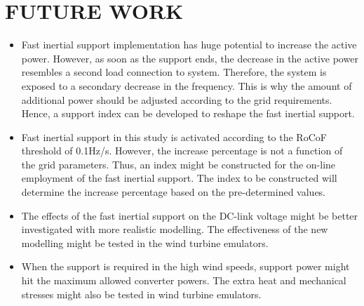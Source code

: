 \section{FUTURE WORK}
\begin{itemize}
	\item Fast inertial support implementation has huge potential to increase the active power. However, as soon as the support ends, the decrease in the active power resembles a second load connection to system. Therefore, the system is exposed to a secondary decrease in the frequency. This is why the amount of additional power should be adjusted according to the grid requirements. Hence, a support index can be developed to reshape the fast inertial support. 
	\item Fast inertial support in this study is activated according to the RoCoF threshold of 0.1Hz/s. However, the increase percentage is not a function of the grid parameters. Thus, an index might be constructed for the on-line employment of the fast inertial support. The index to be constructed will determine the increase percentage based on the pre-determined values. 
	\item The effects of the fast inertial support on the DC-link voltage might be better investigated with more realistic modelling. The effectiveness of the new modelling might be tested in the wind turbine emulators. 
	\item When the support is required in the high wind speeds, support power might hit the maximum allowed converter powers. The extra heat and mechanical stresses might also be tested in wind turbine emulators. 
\end{itemize}